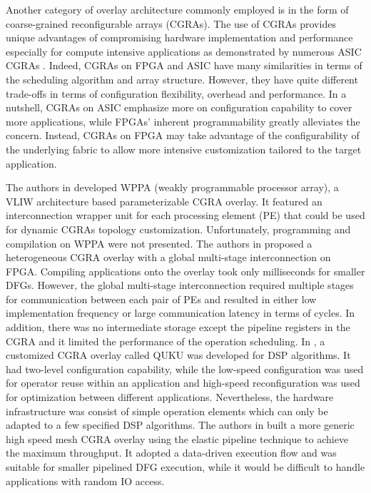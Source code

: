 Another category of overlay architecture commonly employed is in the form of coarse-grained reconfigurable arrays (CGRAs).
The use of CGRAs provides unique advantages of compromising hardware implementation and performance especially for compute intensive applications as demonstrated by numerous ASIC CGRAs \cite{tessier2001reconfigurable} \cite{compton2002reconfigurable}.
Indeed, CGRAs on FPGA and ASIC have many similarities in terms of the scheduling algorithm and array structure.
However, they have quite different trade-offs in terms of configuration flexibility, overhead and performance.
In a nutshell, CGRAs on ASIC emphasize more on configuration capability to cover more applications, while FPGAs' inherent programmability greatly alleviates the concern.
Instead, CGRAs on FPGA may take advantage of the configurability of the underlying fabric to allow more intensive customization tailored to the target application.


The authors in \cite{kissler2006dynamically} developed WPPA (weakly programmable processor array), a VLIW architecture based parameterizable CGRA overlay. It featured an interconnection wrapper unit for each processing element (PE) that could be used for dynamic CGRAs topology customization. Unfortunately, programming and compilation on WPPA were not presented. The authors in \cite{ferreira2011fpga} proposed a heterogeneous CGRA overlay with a global multi-stage interconnection on FPGA. Compiling applications onto the overlay took only milliseconds for smaller DFGs. However, the global multi-stage interconnection required multiple stages for communication between each pair of PEs and resulted in either low implementation frequency or large communication latency in terms of cycles. In addition, there was no intermediate storage except the pipeline registers in the CGRA and it limited the performance of the operation scheduling.
In \cite{shukla2006quku}, a customized CGRA overlay called QUKU was developed for DSP algorithms. It had two-level configuration capability, while the low-speed configuration was used for operator reuse within an application and high-speed reconfiguration was used for optimization between different applications. Nevertheless, the hardware infrastructure was consist of simple operation elements which can only be adapted to a few specified DSP algorithms.
The authors in \cite{capalijia2013pipelined} built a more generic high speed mesh CGRA overlay using the elastic pipeline technique to achieve the maximum throughput. It adopted a data-driven execution flow and was suitable for smaller pipelined DFG execution, while it would be difficult to handle applications with random IO access.


